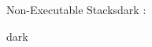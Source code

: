 \label{Non-Executable Stacks}
\begin{baseBoxThree}{Non-Executable Stacks}{dark}
    \bigskip
    :
    \bigskip
    \begin{baseBoxThree}{}{dark}

    \end{baseBoxThree}
    \smallskip
\end{baseBoxThree}
